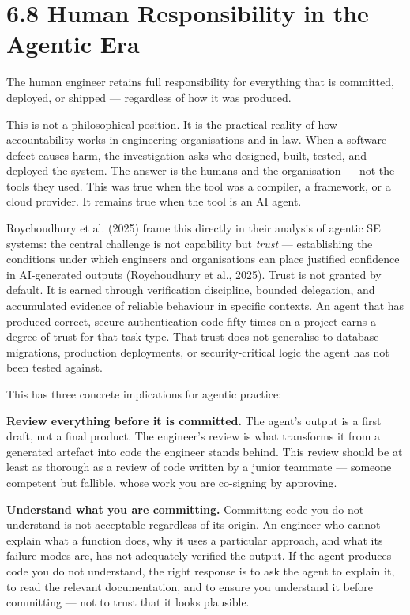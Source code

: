 \documentclass[11pt,a4paper]{book}
\begin{document}
\medskip

\section{6.8 Human Responsibility in the Agentic Era}

The human engineer retains full responsibility for everything that is committed, deployed, or shipped --- regardless of how it was produced.

This is not a philosophical position. It is the practical reality of how accountability works in engineering organisations and in law. When a software defect causes harm, the investigation asks who designed, built, tested, and deployed the system. The answer is the humans and the organisation --- not the tools they used. This was true when the tool was a compiler, a framework, or a cloud provider. It remains true when the tool is an AI agent.

Roychoudhury et al. (2025) frame this directly in their analysis of agentic SE systems: the central challenge is not capability but \textit{trust} --- establishing the conditions under which engineers and organisations can place justified confidence in AI-generated outputs (Roychoudhury et al., 2025). Trust is not granted by default. It is earned through verification discipline, bounded delegation, and accumulated evidence of reliable behaviour in specific contexts. An agent that has produced correct, secure authentication code fifty times on a project earns a degree of trust for that task type. That trust does not generalise to database migrations, production deployments, or security-critical logic the agent has not been tested against.

This has three concrete implications for agentic practice:

\textbf{Review everything before it is committed.} The agent's output is a first draft, not a final product. The engineer's review is what transforms it from a generated artefact into code the engineer stands behind. This review should be at least as thorough as a review of code written by a junior teammate --- someone competent but fallible, whose work you are co-signing by approving.

\textbf{Understand what you are committing.} Committing code you do not understand is not acceptable regardless of its origin. An engineer who cannot explain what a function does, why it uses a particular approach, and what its failure modes are, has not adequately verified the output. If the agent produces code you do not understand, the right response is to ask the agent to explain it, to read the relevant documentation, and to ensure you understand it before committing --- not to trust that it looks plausible.
\end{document}
